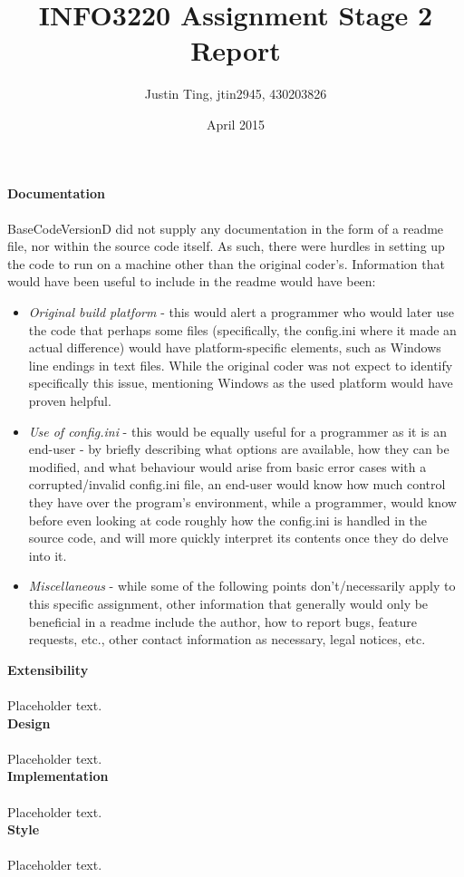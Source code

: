\documentclass[12pt]{article}
\title{INFO3220 Assignment Stage 2 Report}
\author{Justin Ting, jtin2945, 430203826}
\date{April 2015}
\begin{document}
\maketitle

\textbf{Documentation}\\\\
BaseCodeVersionD did not supply any documentation in the form of a readme file, nor within the source code itself. As such, there were hurdles in setting up the code to run on a machine other than the original coder's. Information that would have been useful to include in the readme would have been:\\
\begin{itemize}
\item \textit{Original build platform} - this would alert a programmer who would later use the code that perhaps some files (specifically, the config.ini where it made an actual difference) would have platform-specific elements, such as Windows line endings in text files. While the original coder was not expect to identify specifically this issue, mentioning Windows as the used platform would have proven helpful.
\item \textit{Use of config.ini} - this would be equally useful for a programmer as it is an end-user - by briefly describing what options are available, how they can be modified, and what behaviour would arise from basic error cases with a corrupted/invalid config.ini file, an end-user would know how much control they have over the program's environment, while a programmer, would know before even looking at code roughly how the config.ini is handled in the source code, and will more quickly interpret its contents once they do delve into it.
\item \textit{Miscellaneous} - while some of the following points don't/necessarily apply to this specific assignment, other information that generally would only be beneficial in a readme include the author, how to report bugs, feature requests, etc., other contact information as necessary, legal notices, etc.
\end{itemize}

\textbf{Extensibility}\\\\
Placeholder text.\\

\textbf{Design}\\\\
Placeholder text.\\

\textbf{Implementation}\\\\
Placeholder text.\\

\textbf{Style}\\\\
Placeholder text.\\
\end{document}
